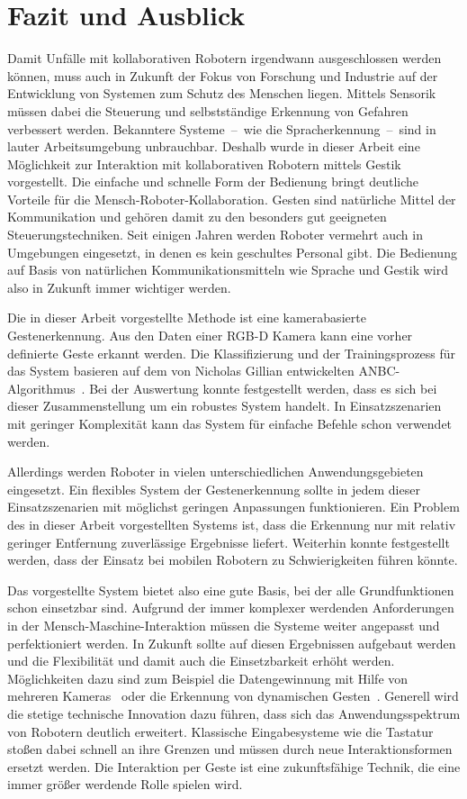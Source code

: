 \chapter{Fazit und Ausblick}
Damit Unfälle mit kollaborativen Robotern irgendwann ausgeschlossen werden können, muss auch in Zukunft der Fokus von Forschung und Industrie auf der Entwicklung von Systemen zum Schutz des Menschen liegen. Mittels Sensorik müssen dabei die Steuerung und selbstständige Erkennung von Gefahren verbessert werden. Bekanntere Systeme~--~wie die Spracherkennung~--~sind in lauter Arbeitsumgebung unbrauchbar. Deshalb wurde in dieser Arbeit eine Möglichkeit zur Interaktion mit kollaborativen Robotern mittels Gestik vorgestellt. Die einfache und schnelle Form der Bedienung bringt deutliche Vorteile für die Mensch-Roboter-Kollaboration. Gesten sind natürliche Mittel der Kommunikation und gehören damit zu den besonders gut geeigneten Steuerungstechniken. Seit einigen Jahren werden Roboter vermehrt auch in Umgebungen eingesetzt, in denen es kein geschultes Personal gibt. Die Bedienung auf Basis von natürlichen Kommunikationsmitteln wie Sprache und Gestik wird also in Zukunft immer wichtiger werden. 

Die in dieser Arbeit vorgestellte Methode ist eine kamerabasierte Gestenerkennung. Aus den Daten einer RGB-D Kamera kann eine vorher definierte Geste erkannt werden. Die Klassifizierung und der Trainingsprozess für das System basieren auf dem von Nicholas Gillian entwickelten ANBC-Algorithmus~\cite{gillianANBC}. Bei der Auswertung konnte festgestellt werden, dass es sich bei dieser Zusammenstellung um ein robustes System handelt. In Einsatzszenarien mit geringer Komplexität kann das System für einfache Befehle schon verwendet werden.

Allerdings werden Roboter in vielen unterschiedlichen Anwendungsgebieten eingesetzt. Ein flexibles System der Gestenerkennung sollte in jedem dieser Einsatzszenarien mit möglichst geringen Anpassungen funktionieren. Ein Problem des in dieser Arbeit vorgestellten Systems ist, dass die Erkennung nur mit relativ geringer Entfernung zuverlässige Ergebnisse liefert. Weiterhin konnte festgestellt werden, dass der Einsatz bei mobilen Robotern zu Schwierigkeiten führen könnte.

Das vorgestellte System bietet also eine gute Basis, bei der alle Grundfunktionen schon einsetzbar sind. Aufgrund der immer komplexer werdenden Anforderungen in der Mensch-Maschine-Interaktion müssen die Systeme weiter angepasst und perfektioniert werden. In Zukunft sollte auf diesen Ergebnissen aufgebaut werden und die Flexibilität und damit auch die Einsetzbarkeit erhöht werden. Möglichkeiten dazu sind zum Beispiel die Datengewinnung mit Hilfe von mehreren Kameras~\cite{multipleDepthCameras} oder die Erkennung von dynamischen Gesten~\cite{hiddenMarkov}. Generell wird die stetige technische Innovation dazu führen, dass sich das Anwendungsspektrum von Robotern deutlich erweitert. Klassische Eingabesysteme wie die Tastatur stoßen dabei schnell an ihre Grenzen und müssen durch neue Interaktionsformen ersetzt werden. Die Interaktion per Geste ist eine zukunftsfähige Technik, die eine immer größer werdende Rolle spielen wird.  

 